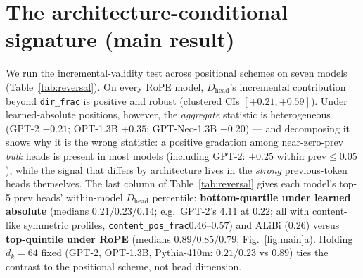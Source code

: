 \documentclass[11pt]{article}
\newcommand{\dirfrac}{\texttt{dir\_frac}\xspace}
\newcommand{\Dhead}{\ensuremath{D_{\text{head}}}\xspace}
\newcommand{\contentpos}{\texttt{content\_pos\_frac}\xspace}
\newcommand{\Rope}{RoPE\xspace}
\begin{document}
\section{The architecture-conditional signature (main result)}\label{sec:reversal}
We run the incremental-validity test across positional schemes on seven models (Table~\ref{tab:reversal}). On every
\Rope model, \Dhead's incremental contribution beyond \dirfrac is positive and robust (clustered CIs
$[+0.21,+0.59]$). Under learned-absolute positions, however, the \emph{aggregate} statistic is heterogeneous
(GPT-2 $-0.21$; OPT-1.3B $+0.35$; GPT-Neo-1.3B $+0.20$) --- and decomposing it shows why it is the wrong statistic: a
positive gradation among near-zero-prev \emph{bulk} heads is present in most models (including GPT-2: $+0.25$ within
$\text{prev}{\le}0.05$), while the signal that differs by architecture lives in the \emph{strong} previous-token
heads themselves. The last column of Table~\ref{tab:reversal} gives each model's top-5 prev heads' within-model
\Dhead percentile: \textbf{bottom-quartile under learned absolute} (medians $0.21/0.23/0.14$; e.g.\ GPT-2's 4.11 at
$0.22$; all with content-like symmetric profiles, \contentpos $0.46$--$0.57$) and ALiBi ($0.26$) versus \textbf{top-quintile under
\Rope} (medians $0.89/0.85/0.79$; Fig.~\ref{fig:main}a). Holding
$d_k{=}64$ fixed (GPT-2, OPT-1.3B, Pythia-410m: $0.21/0.23$ vs $0.89$) ties the contrast to the positional scheme,
not head dimension.
\end{document}

